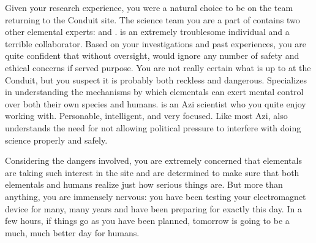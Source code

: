 \documentclass[char]{elementals}
\begin{document}
Given your research experience, you were a natural choice to be on the team returning to the Conduit site. The science team you are a part of contains two other elemental experts: \cMS{\intrp} and \cScientist{\intro}. \cMS{} is an extremely troublesome individual and a terrible collaborator. Based on your investigations and past experiences, you are quite confident that without oversight, \cMS{\they} would ignore any number of safety and ethical concerns if served \cMS{\their} purpose. You are not really certain what \cMS{\they} is up to at the Conduit, but you suspect it is probably both reckless and dangerous. Specializes in understanding the mechanisms by which elementals can exert mental control over both their own species and humans. \cScientist{} is an Azi scientist who you quite enjoy working with. Personable, intelligent, and very focused. Like most Azi, \cScientist{\they} also understands the need for not allowing political pressure to interfere with doing science properly and safely.

Considering the dangers involved, you are extremely concerned that elementals are taking such interest in the site and are determined to make sure that both elementals and humans realize just how serious things are. But more than anything, you are immensely nervous: you have been testing your electromagnet device for many, many years and have been preparing for exactly this day. In a few hours, if things go as you have been planned, tomorrow is going to be a much, much better day for humans.


\end{document}
